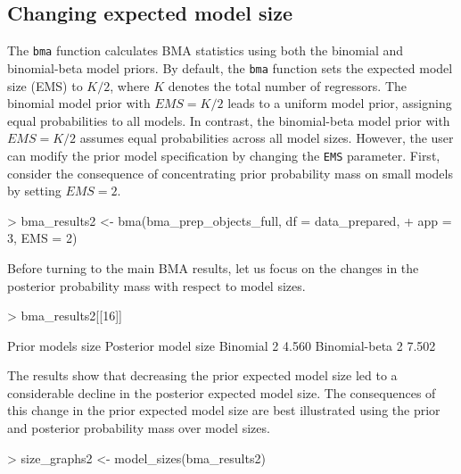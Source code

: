 \documentclass[a4paper]{article}
\begin{document}
\subsection{Changing expected model size}\label{ems}
The \verb+bma+ function calculates BMA statistics using both the binomial and binomial-beta model priors.
By default, the \verb+bma+ function sets the expected model size (EMS) to $K/2$, where $K$ denotes the total number of regressors.
The binomial model prior with $EMS = K/2$ leads to a uniform model prior, assigning equal probabilities to all models.
In contrast, the binomial-beta model prior with $EMS = K/2$ assumes equal probabilities across all model sizes.
However, the user can modify the prior model specification by changing the \verb+EMS+ parameter.
First, consider the consequence of concentrating prior probability mass on small models by setting $EMS = 2$.
\begin{Schunk}
\begin{Sinput}
> bma_results2 <- bma(bma_prep_objects_full, df = data_prepared,
+                     app = 3, EMS = 2)
\end{Sinput}
\end{Schunk}
Before turning to the main BMA results, let us focus on the changes in the posterior probability mass with respect to model sizes.
\begin{Schunk}
\begin{Sinput}
> bma_results2[[16]]
\end{Sinput}
\begin{Soutput}
              Prior models size Posterior model size
Binomial                      2                4.560
Binomial-beta                 2                7.502
\end{Soutput}
\end{Schunk}
The results show that decreasing the prior expected model size led to a considerable decline in the posterior expected model size.
The consequences of this change in the prior expected model size are best illustrated using the prior and posterior probability mass over model sizes.
\begin{Schunk}
\begin{Sinput}
> size_graphs2 <- model_sizes(bma_results2)
\end{Sinput}
\end{Schunk}
\end{document}

